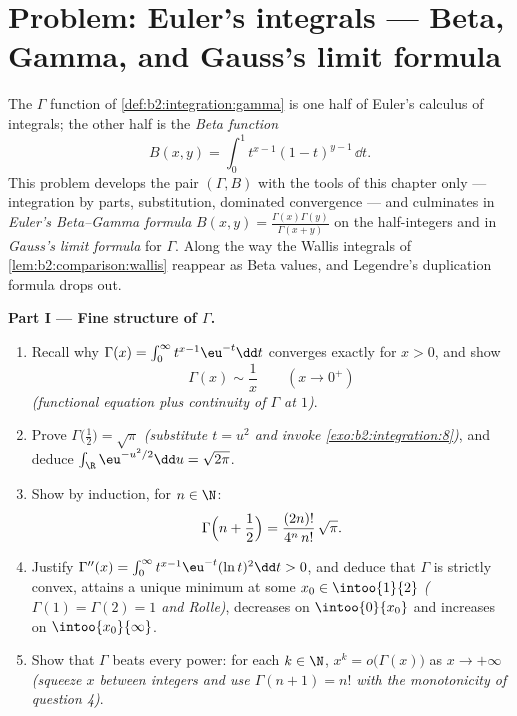 \section{Problem: Euler's integrals --- Beta, Gamma, and Gauss's
limit formula}

\begin{problem}\label{pb:b2:integration:1}
The $\Gamma$ function of \cref{def:b2:integration:gamma} is one
half of Euler's calculus of integrals; the other half is the
\emph{Beta function}
\[
B(x, y) = \int_0^1 t^{x-1}(1 - t)^{y-1}\,\dd t .
\]
This problem develops the pair $(\Gamma, B)$ with the tools of
this chapter only --- integration by parts, substitution,
dominated convergence --- and culminates in \emph{Euler's
Beta--Gamma formula} $B(x,y) = \frac{\Gamma(x)\Gamma(y)}
{\Gamma(x+y)}$ on the half-integers and in \emph{Gauss's limit
formula} for $\Gamma$. Along the way
the Wallis integrals of \cref{lem:b2:comparison:wallis} reappear
as Beta values, and Legendre's duplication formula drops out.

\medskip
\noindent\textbf{Part I --- Fine structure of $\Gamma$.}
\begin{enumerate}
  \item Recall why $\Gamma(x) = \int_0^\infty t^{x-1}\eu^{-t}\dd
        t$ converges exactly for $x > 0$, and show
        \[
        \Gamma(x) \sim \frac1x \qquad (x \to 0^+)
        \]
        \emph{(functional equation plus continuity of $\Gamma$ at
        $1$)}.
  \item Prove $\Gamma\bigl(\tfrac12\bigr) = \sqrt\pi$
        \emph{(substitute $t = u^2$ and invoke
        \cref{exo:b2:integration:8})}, and deduce
        $\int_\R \eu^{-u^2/2}\dd u = \sqrt{2\pi}$.
  \item Show by induction, for $n \in \N$:
        \[
        \Gamma\Bigl(n + \frac12\Bigr)
        = \frac{(2n)!}{4^n\,n!}\,\sqrt\pi .
        \]
  \item Justify $\Gamma''(x) = \int_0^\infty
        t^{x-1}\eu^{-t}(\ln t)^2\dd t > 0$, and deduce that
        $\Gamma$ is strictly convex, attains a unique minimum at
        some $x_0 \in \intoo{1}{2}$ \emph{($\Gamma(1) = \Gamma(2)
        = 1$ and Rolle)}, decreases on $\intoo{0}{x_0}$ and
        increases on $\intoo{x_0}{\infty}$.
  \item Show that $\Gamma$ beats every power: for each $k \in
        \N$, $x^k = o\bigl(\Gamma(x)\bigr)$ as $x \to +\infty$
        \emph{(squeeze $x$ between integers and use $\Gamma(n+1)
        = n!$ with the monotonicity of question 4)}.
\end{enumerate}


\end{problem}
